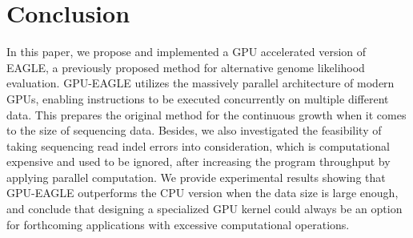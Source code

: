 \documentclass{PHlab-thesis}
\begin{document}
\chapter{Conclusion}
In this paper, we propose and implemented a GPU accelerated version of EAGLE, a previously proposed method for alternative genome likelihood evaluation. GPU-EAGLE utilizes the massively parallel architecture of modern GPUs, enabling instructions to be executed concurrently on multiple different data. This prepares the original method for the continuous growth when it comes to the size of sequencing data. Besides, we also investigated the feasibility of taking sequencing read indel errors into consideration, which is computational expensive and used to be ignored, after increasing the program throughput by applying parallel computation. We provide experimental results showing that GPU-EAGLE outperforms the CPU version when the data size is large enough, and conclude that designing a specialized GPU kernel could always be an option for forthcoming applications with excessive computational operations.

\newpage
{}
\printbibliography
\end{document}
